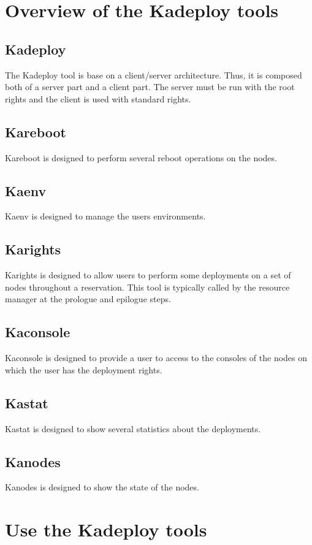 \documentclass[a4wide,10pt,oneside]{book}
\begin{document}
\section{Overview of the Kadeploy tools}
\subsection{Kadeploy}
The Kadeploy tool is base on a client/server architecture. Thus, it is composed both of a server part and a client part. The server must be run with the root rights and the client is used with standard rights.

\subsection{Kareboot}
Kareboot is designed to perform several reboot operations on the nodes.

\subsection{Kaenv}
Kaenv is designed to manage the users environments.

\subsection{Karights}
Karights is designed to allow users to perform some deployments on a set of nodes throughout a reservation. This tool is typically called by the resource manager at the prologue and epilogue steps.

\subsection{Kaconsole}
Kaconsole is designed to provide a user to access to the consoles of the nodes on which the user has the deployment rights.

\subsection{Kastat}
Kastat is designed to show several statistics about the deployments.

\subsection{Kanodes}
Kanodes is designed to show the state of the nodes.

\section{Use the Kadeploy tools}
\end{document}
